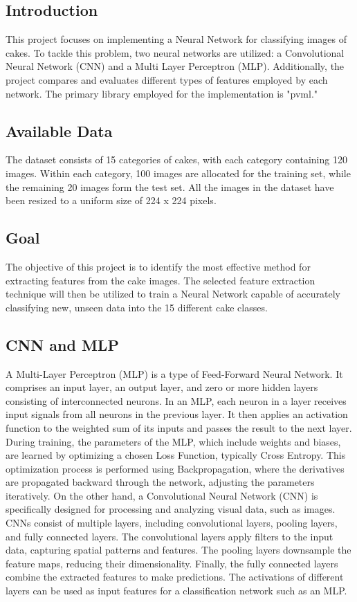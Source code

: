 \documentclass{article}
\begin{document}
\begin{multicols}{2}
    
\section{Introduction}
This project focuses on implementing a Neural Network for classifying images of cakes. To tackle this problem, two neural networks are utilized: a Convolutional Neural Network (CNN) 
and a Multi Layer Perceptron (MLP). Additionally, the project compares and evaluates different types of features employed by each network. The primary library employed for 
the implementation is "pvml."

\subsection{Available Data}
The dataset consists of 15 categories of cakes, with each category containing 120 images. Within each category, 100 images are allocated for the training set,
while the remaining 20 images form the test set. All the images in the dataset have been resized to a uniform size of 224 x 224 pixels.

\subsection{Goal}
The objective of this project is to identify the most effective method for extracting features from the cake images. The selected feature extraction technique will then be utilized 
to train a Neural Network capable of accurately classifying new, unseen data into the 15 different cake classes.

\subsection{CNN and MLP}
A Multi-Layer Perceptron (MLP) is a type of Feed-Forward Neural Network. It comprises an input layer, an output layer, and zero or more hidden layers consisting of 
interconnected neurons. In an MLP, each neuron in a layer receives input signals from all neurons in the previous layer. It then applies an activation function to the 
weighted sum of its inputs and passes the result to the next layer.
During training, the parameters of the MLP, which include weights and biases, are learned by optimizing a chosen Loss Function, typically Cross Entropy. 
This optimization process is performed using Backpropagation, where the derivatives are propagated backward through the network, adjusting the parameters iteratively.
On the other hand, a Convolutional Neural Network (CNN) is specifically designed for processing and analyzing visual data, such as images. CNNs consist of multiple layers, 
including convolutional layers, pooling layers, and fully connected layers. The convolutional layers apply filters to the input data, capturing spatial patterns and features. 
The pooling layers downsample the feature maps, reducing their dimensionality. Finally, the fully connected layers combine the extracted features to make predictions. The 
activations of different layers can be used as input features for a classification network such as an MLP.



\end{multicols}
\end{document}
